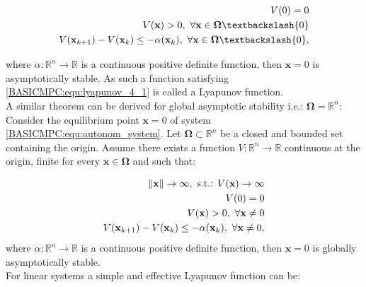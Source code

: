     \begin{subequations}
    \label{BASICMPC:equ:lyapunov_4_1}
        \begin{align}
                V(0)=0 \label{BASICMPC:equ:lyapunov_4_1_a}\\
                V(\textbf{x})>0,\textnormal{ }\forall\textbf{x}\in\boldsymbol{\Omega}\textbackslash\{0\} \label{BASICMPC:equ:lyapunov_4_1_b}\\
                V(\textbf{x}_{k+1})-V(\textbf{x}_{k})\leq-\alpha(\textbf{x}_k),\textnormal{ }\forall\textbf{x}\in\boldsymbol{\Omega}\textbackslash\{0\}, \label{BASICMPC:equ:lyapunov_4_1_c}
        \end{align}
    \end{subequations}

     where $\alpha:\mathbb{R}^n\rightarrow\mathbb{R}$ is a continuous positive definite function, then $\textbf{x}=0$ is asymptotically stable. As such a function satisfying \ref{BASICMPC:equ:lyapunov_4_1} is called a Lyapunov function.\\
     A similar theorem can be derived for global asymptotic stability i.e.: $\boldsymbol{\Omega}=\mathbb{R}^n$:
     Consider the equilibrium point $\textbf{x}=0$ of system \ref{BASICMPC:equ:autonom_system}. Let $\boldsymbol{\Omega}\subset\mathbb{R}^n$ be a closed and bounded set containing the origin. Assume there exists a function $V:\mathbb{R}^n\rightarrow\mathbb{R}$ continuous at the origin, finite for every $\textbf{x}\in\boldsymbol{\Omega}$ and such that:

     \begin{subequations}
    \label{BASICMPC:equ:lyapunov_4_2}
        \begin{align}
                \left\lVert\textbf{x}\right\rVert\rightarrow\infty,\textnormal{ s.t.: }V(\textbf{x})\rightarrow\infty \label{BASICMPC:equ:lyapunov_4_2_a}\\
                V(0)=0 \label{BASICMPC:equ:lyapunov_4_2_b}\\
                V(\textbf{x})>0,\textnormal{ }\forall\textbf{x}\neq0 \label{BASICMPC:equ:lyapunov_4_2_c}\\
                V(\textbf{x}_{k+1})-V(\textbf{x}_{k})\leq-\alpha(\textbf{x}_k),\textnormal{ }\forall\textbf{x}\neq0, \label{BASICMPC:equ:lyapunov_4_2_d}
            \end{align}
            \end{subequations}
     where $\alpha:\mathbb{R}^n\rightarrow\mathbb{R}$ is a continuous positive definite function, then $\textbf{x}=0$ is globally asymptotically stable.\\
     For linear systems a simple and effective Lyapunov function can be:

